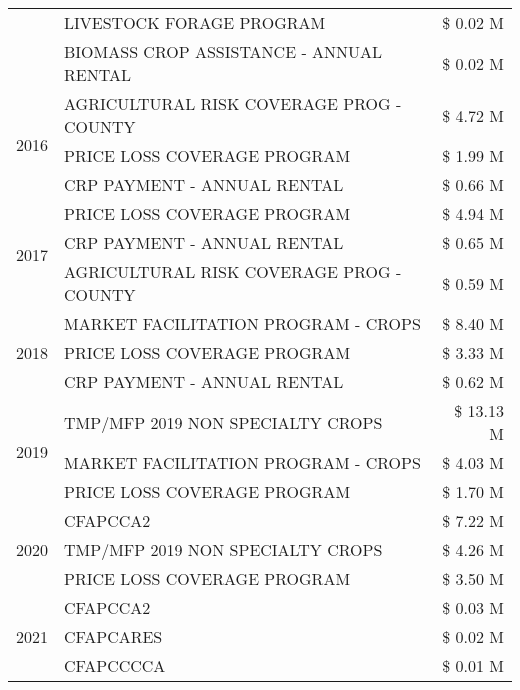 \begin{tabular}{llr}
 & LIVESTOCK FORAGE PROGRAM & \$ 0.02 M \\
 & BIOMASS CROP ASSISTANCE - ANNUAL RENTAL & \$ 0.02 M \\
\cline{1-3}
\multirow[t]{3}{*}{2016} & AGRICULTURAL RISK COVERAGE PROG - COUNTY & \$ 4.72 M \\
 & PRICE LOSS COVERAGE PROGRAM & \$ 1.99 M \\
 & CRP PAYMENT - ANNUAL RENTAL & \$ 0.66 M \\
\cline{1-3}
\multirow[t]{3}{*}{2017} & PRICE LOSS COVERAGE PROGRAM & \$ 4.94 M \\
 & CRP PAYMENT - ANNUAL RENTAL & \$ 0.65 M \\
 & AGRICULTURAL RISK COVERAGE PROG - COUNTY & \$ 0.59 M \\
\cline{1-3}
\multirow[t]{3}{*}{2018} & MARKET FACILITATION PROGRAM - CROPS & \$ 8.40 M \\
 & PRICE LOSS COVERAGE PROGRAM & \$ 3.33 M \\
 & CRP PAYMENT - ANNUAL RENTAL & \$ 0.62 M \\
\cline{1-3}
\multirow[t]{3}{*}{2019} & TMP/MFP 2019 NON SPECIALTY CROPS & \$ 13.13 M \\
 & MARKET FACILITATION PROGRAM - CROPS & \$ 4.03 M \\
 & PRICE LOSS COVERAGE PROGRAM & \$ 1.70 M \\
\cline{1-3}
\multirow[t]{3}{*}{2020} & CFAPCCA2 & \$ 7.22 M \\
 & TMP/MFP 2019 NON SPECIALTY CROPS & \$ 4.26 M \\
 & PRICE LOSS COVERAGE PROGRAM & \$ 3.50 M \\
\cline{1-3}
\multirow[t]{3}{*}{2021} & CFAPCCA2 & \$ 0.03 M \\
 & CFAPCARES & \$ 0.02 M \\
 & CFAPCCCCA & \$ 0.01 M \\
\cline{1-3}
\bottomrule
\end{tabular}
